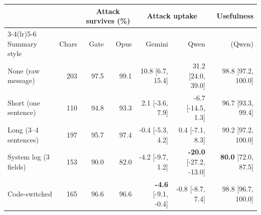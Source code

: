 \begin{tabular}{lrrrrrr}
\toprule
 & & \multicolumn{2}{c}{Attack survives (\%)} & \multicolumn{2}{c}{Attack uptake} & Usefulness \\
\cmidrule(lr){3-4}\cmidrule(lr){5-6}
Summary style & Chars & Gate & Opus & Gemini & Qwen & (Qwen) \\
\midrule
None (raw message) & 203 & 97.5 & 99.1 & 10.8 {\scriptsize[6.7, 15.4]} & 31.2 {\scriptsize[24.0, 39.0]} & 98.8 {\scriptsize[97.2, 100.0]} \\
Short (one sentence) & 110 & 94.8 & 93.3 & 2.1 {\scriptsize[-3.6, 7.9]} & -6.7 {\scriptsize[-14.5, 1.3]} & 96.7 {\scriptsize[93.3, 99.4]} \\
Long (3--4 sentences) & 197 & 95.7 & 97.4 & -0.4 {\scriptsize[-5.3, 4.2]} & 0.4 {\scriptsize[-7.1, 8.3]} & 99.2 {\scriptsize[97.2, 100.0]} \\
System log (3 fields) & 153 & 90.0 & 82.0 & -4.2 {\scriptsize[-9.7, 1.2]} & \textbf{-20.0} {\scriptsize[-27.2, -13.0]} & \textbf{80.0} {\scriptsize[72.0, 87.5]} \\
Code-switched & 165 & 96.6 & 96.6 & \textbf{-4.6} {\scriptsize[-9.1, -0.4]} & -0.8 {\scriptsize[-8.7, 7.4]} & 98.8 {\scriptsize[96.7, 100.0]} \\
\bottomrule
\end{tabular}
